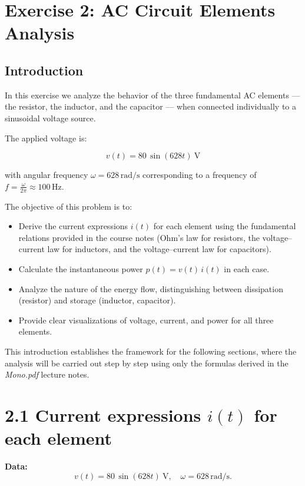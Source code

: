 \documentclass{article}
\begin{document}
\newpage
\section*{Exercise 2: AC Circuit Elements Analysis}

\subsection*{Introduction}

In this exercise we analyze the behavior of the three fundamental AC elements — 
the resistor, the inductor, and the capacitor — when connected individually to 
a sinusoidal voltage source. 

The applied voltage is:

\[
v(t) = 80 \,\sin(628t)\ \text{V}
\]

with angular frequency $\omega = 628 \,\text{rad/s}$ corresponding to 
a frequency of $f = \tfrac{\omega}{2\pi} \approx 100 \,\text{Hz}$.

The objective of this problem is to:

\begin{itemize}
    \item Derive the current expressions $i(t)$ for each element using the 
    fundamental relations provided in the course notes (Ohm’s law for resistors, 
    the voltage–current law for inductors, and the voltage–current law for capacitors).
    \item Calculate the instantaneous power $p(t) = v(t)\,i(t)$ in each case.
    \item Analyze the nature of the energy flow, distinguishing between 
    dissipation (resistor) and storage (inductor, capacitor).
    \item Provide clear visualizations of voltage, current, and power for all 
    three elements.
\end{itemize}

This introduction establishes the framework for the following sections, where 
the analysis will be carried out step by step using only the formulas derived 
in the \textit{Mono.pdf} lecture notes.


\section*{2.1 \; Current expressions $i(t)$ for each element}

\noindent\textbf{Data:}
\[
v(t) = 80 \,\sin(628t)\ \text{V}, \quad \omega = 628 \,\text{rad/s}.
\]
\end{document}
